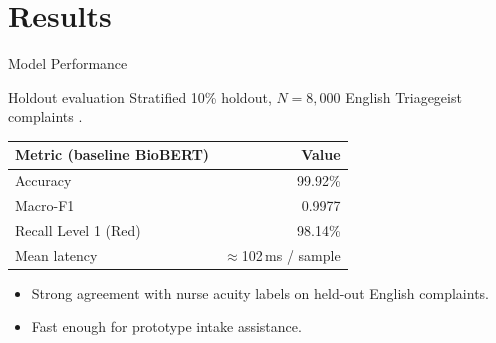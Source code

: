 \section{Results}

\begin{frame}{Model Performance}
	\begin{block}{Holdout evaluation}
		Stratified 10\% holdout, \(N=8{,}000\) English Triagegeist complaints \citep{triagegeist2025}.
	\end{block}
	\begin{center}
	\small
	\begin{tabular}{|l|r|}
	\hline
	\textbf{Metric (baseline BioBERT)} & \textbf{Value} \\
	\hline
	Accuracy & 99.92\% \\
	Macro-F1 & 0.9977 \\
	Recall Level 1 (Red) & 98.14\% \\
	Mean latency & \(\approx\)102\,ms / sample \\
	\hline
	\end{tabular}
	\end{center}
	\medskip
	\begin{itemize}
		\item Strong agreement with nurse acuity labels on held-out English complaints.
		\item Fast enough for prototype intake assistance.
	\end{itemize}
\end{frame}

